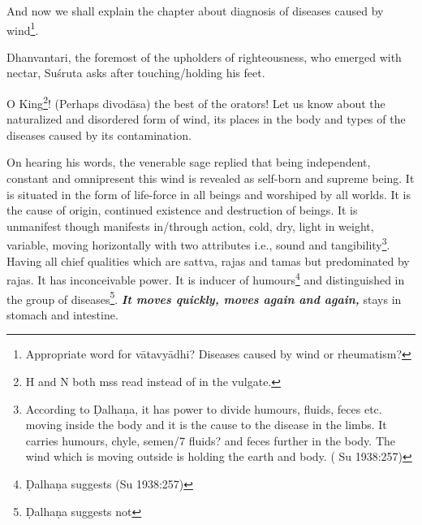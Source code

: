 \begin{translation}
    
\item [1] And now we shall explain the chapter about diagnosis of diseases
caused by wind\footnote{ Appropriate word for vātavyādhi? Diseases
    caused by wind or rheumatism?}.
    
    \item[2]
    
    \item[3] Dhanvantari, the foremost of the upholders of righteousness, who
    emerged with nectar, Suśruta asks after touching/holding his 
    feet.
    
    \item[4] O King\footnote{ H and N both mss read instead of 
     in the
        vulgate.}! (Perhaps divodāsa) the best of the orators! Let us know
        about the naturalized and disordered form of wind, its places in the
        body and types of the diseases caused by its contamination.
        
        \item[5--9ab] On hearing his words, the venerable sage replied that being
        independent, constant and omnipresent this wind is revealed as self-born
        and supreme being. It is situated in the form of life-force in all
        beings and worshiped by all worlds. It is the cause of origin, continued
        existence and destruction of beings. It is unmanifest though manifests
        in/through action, cold, dry, light in weight, variable, moving
        horizontally with two attributes i.e., sound and tangibility\footnote{
            According to Ḍalhaṇa, it has power to divide humours, fluids, feces
            etc. moving inside the body and it is the cause to the disease in the
            limbs. It carries humours, chyle, semen/7 fluids? and feces further in
            the body. The wind which is moving outside is holding the earth and
            body. (      Su 
            1938:257)}.
            Having all chief qualities which are sattva, rajas and tamas but
            predominated by rajas. It has inconceivable power. It is inducer of
            humours\footnote{ Ḍalhaṇa suggests  (Su 1938:257)} and
                distinguished in the group of diseases\footnote{ Ḍalhaṇa suggests
                     not  }. 
                    \emph{\textbf{It move}\textbf{s
                            quickly, moves again and again, }}stays in stomach 
                            and
                    intestine.
                    

\end{translation}
